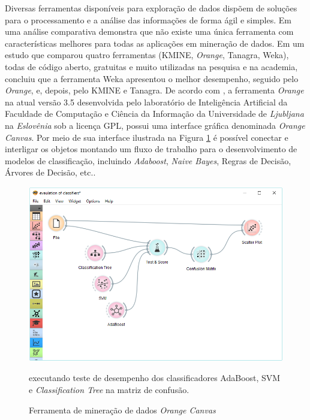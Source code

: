 Diversas ferramentas disponíveis para exploração de dados dispõem de soluções 
para o processamento e a análise das informações de forma ágil e simples. 
Em uma análise comparativa \cite{boscarioli2014avaliaccao} demonstra que não 
existe uma única ferramenta com características melhores para todas as 
aplicações em mineração de dados. Em um estudo que comparou quatro ferramentas 
(KMINE, \textit{Orange}, Tanagra, Weka), todas de código aberto, gratuitas e 
muito utilizadas na pesquisa e na academia, \cite{wahbeh2011comparison} 
concluiu que a ferramenta Weka apresentou o melhor desempenho, seguido pelo 
\textit{Orange}, e, depois, pelo KMINE e Tanagra. De acordo com 
\cite{JMLR:demsar13a}, a ferramenta \textit{Orange} na atual versão 3.5 
desenvolvida pelo laboratório de Inteligência Artificial da Faculdade de 
Computação e Ciência da Informação da Universidade de \textit{Ljubljana} na 
\textit{Eslovênia} sob a licença GPL, possui uma interface gráfica denominada 
\textit{Orange Canvas}. Por meio de sua interface ilustrada na Figura 
\ref{figure:orange_canvas} é possível conectar e interligar os objetos 
montando um fluxo de trabalho para o desenvolvimento de modelos de 
classificação, incluindo \textit{Adaboost}, \textit{Naive Bayes}, Regras de 
Decisão, Árvores de Decisão, etc..

\begin{figure}[H]
\begin{center}
    \includegraphics[scale=0.50]{images/orange_canvas.png}
\end{center}
\caption{Ferramenta de mineração de dados \textit{Orange Canvas}} 
executando teste de desempenho dos classificadores AdaBoost, SVM e 
\textit{Classification Tree} na matriz de confusão.  
\label{figure:orange_canvas}
\end{figure}


